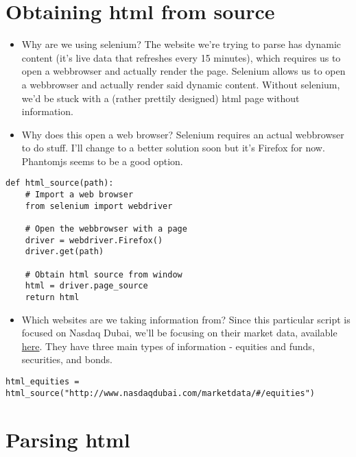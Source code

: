 \documentclass[11pt]{article}
\author{Vishakh Kumar}
\date{\today}
\title{}
\begin{document}
\tableofcontents




\section{Obtaining html from source}
\label{sec:orgf2cf69e}


\begin{itemize}
\item Why are we using selenium?
The website we're trying to parse has dynamic content (it's live data that refreshes every 15 minutes), which requires us to open a webbrowser and actually render the page. Selenium allows us to open a webbrowser and actually render said dynamic content. Without selenium, we'd be stuck with a (rather prettily designed) html page without information.

\item Why does this open a web browser?
Selenium requires an actual webbrowser to do stuff. I'll change to a better solution soon but it's Firefox for now. Phantomjs seems to be a good option.
\end{itemize}

\begin{verbatim}
def html_source(path):
    # Import a web browser
    from selenium import webdriver

    # Open the webbrowser with a page
    driver = webdriver.Firefox()
    driver.get(path)

    # Obtain html source from window
    html = driver.page_source
    return html
\end{verbatim}

\begin{itemize}
\item Which websites are we taking information from?
Since this particular script is focused on Nasdaq Dubai, we'll be focusing on their market data, available \href{http://www.nasdaqdubai.com/marketdata/\#/equities}{here}. They have three main types of information - equities and funds, securities, and bonds.
\end{itemize}

\begin{verbatim}
html_equities = html_source("http://www.nasdaqdubai.com/marketdata/#/equities")
\end{verbatim}


\section{Parsing html}
\label{sec:org25f0c6f}
\end{document}

